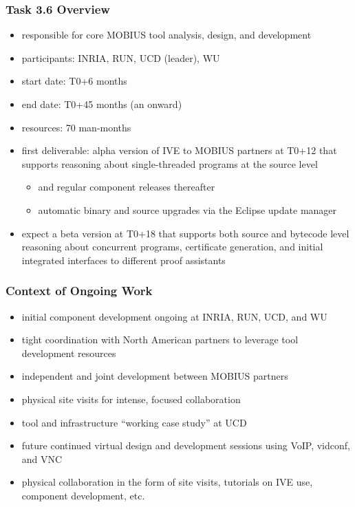 \documentclass{beamer}
\begin{document}
\begin{frame}\frametitle{Task 3.6 Overview}
  \begin{itemize}
  \item responsible for core MOBIUS tool analysis, design, and
    development
  \item participants: INRIA, RUN, UCD (leader), WU
  \item start date: T0+6 months
  \item end date: T0+45 months (an onward)
  \item resources: 70 man-months
  \item first deliverable: alpha version of IVE to MOBIUS partners
    at T0+12 that supports reasoning about single-threaded programs at
    the source level
    \begin{itemize}
    \item and regular component releases thereafter
    \item automatic binary and source upgrades via the Eclipse update
      manager
    \end{itemize}
  \item expect a beta version at T0+18 that supports both source and
    bytecode level reasoning about concurrent programs, certificate
    generation, and initial integrated interfaces to different proof
    assistants
  \end{itemize}
\end{frame}

\begin{frame}\frametitle{Context of Ongoing Work}
  \begin{itemize}
  \item initial component development ongoing at INRIA, RUN, UCD, and WU
  \item tight coordination with North American partners to leverage tool
    development resources
  \item independent and joint development between MOBIUS partners
  \item physical site visits for intense, focused collaboration
  \item tool and infrastructure ``working case study'' at UCD
  \item future continued virtual design and development sessions using
    VoIP, vidconf, and VNC
  \item physical collaboration in the form of site visits, tutorials
    on IVE use, component development, etc.
  \end{itemize}
\end{frame}
\end{document}
